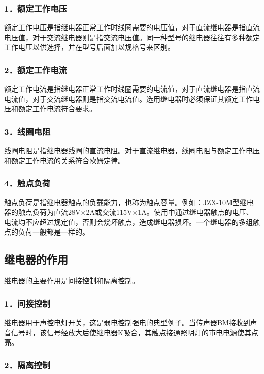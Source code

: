 \documentclass[12pt,UTF8]{ctexbook}
\begin{document}
\subsubsection{1．额定工作电压}

额定工作电压是指继电器正常工作时线圈需要的电压值，对于直流继电器是指直流电压值，对于交流继电器则是指交流电压值。同一种型号的继电器往往有多种额定工作电压以供选择，并在型号后面加以规格号来区别。

\subsubsection{2．额定工作电流}

额定工作电流是指继电器正常工作时线圈需要的电流值，对于直流继电器是指直流电流值，对于交流继电器则是指交流电流值。选用继电器时必须保证其额定工作电压和额定工作电流符合要求。

\subsubsection{3．线圈电阻}

线圈电阻是指继电器线圈的直流电阻。对于直流继电器，线圈电阻与额定工作电压和额定工作电流的关系符合欧姆定律。

\subsubsection{4．触点负荷}

触点负荷是指继电器触点的负载能力，也称为触点容量。例如：JZX-10M型继电器的触点负荷为直流28V×2A或交流115V×1A。使用中通过继电器触点的电压、电流均不应超过规定值，否则会烧坏触点，造成继电器损坏。一个继电器的多组触点的负荷一般都是一样的。

\subsection{继电器的作用}

继电器的主要作用是间接控制和隔离控制。

\subsubsection{1．间接控制}

继电器用于声控电灯开关，这是弱电控制强电的典型例子。当传声器BM接收到声音信号时，该信号经放大后使继电器K吸合，其触点接通照明灯的市电电源使其点亮。

\subsubsection{2．隔离控制}
\end{document}
